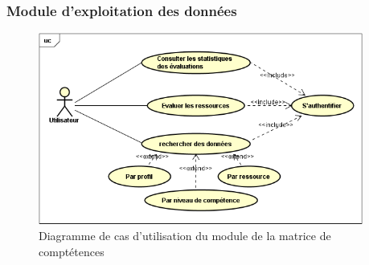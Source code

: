 \newpage
\subsubsection{Module d'exploitation des données}
\begin{figure}[h!]  
  \centering
    \includegraphics[width=0.95\textwidth]{chapitre2/Figures/competencesUC.png}
  \caption{Diagramme de cas d’utilisation du module de la matrice de comptétences}
\end{figure}
